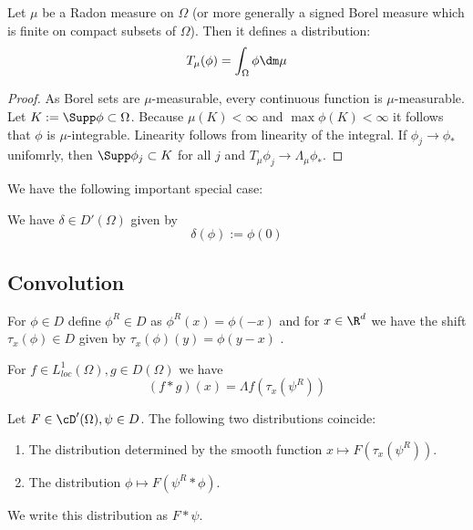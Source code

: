 	\begin{example}
		Let $\mu$ be a Radon measure on $\Omega$ (or more generally a signed Borel measure which is finite on compact subsets of $\Omega$). Then it defines a distribution:
		\[
		T_\mu(\phi) = \int_{\Omega} \phi \dm \mu
		\]
	\end{example}
	\begin{proof}
		As Borel sets are $\mu$-measurable, every continuous function is $\mu$-measurable. Let $K := \Supp \phi \subset \Omega $. Because $\mu(K) < \infty$ and $\max \phi(K) < \infty$ it follows that $\phi$ is $\mu$-integrable. Linearity follows from linearity of the integral. If $\phi_j \to \phi_*$ unifomrly, then $\Supp \phi_j  \subset K$ for all $j$ and $T_\mu \phi_j \to \Lambda_\mu \phi_*$.
	\end{proof}
	We have the following important special case:
	\begin{example}
		We have $\delta \in D'(\Omega)$ given by
		\[
		\delta(\phi) := \phi(0)
		\]
	\end{example}

	\subsection{Convolution}
	\begin{notation}
		For $\phi \in D$ define $\phi^R \in D$ as $\phi^R(x) = \phi(-x)$ and for $x \in \R^d$ we have the shift $\tau_x(\phi) \in D$ given by $\tau_x(\phi)(y) = \phi(y - x)$ .
	\end{notation}
	\begin{example}{\label{ex:conv}}
		For $f \in L^1_{loc}(\Omega), g \in D(\Omega)$ we have
		\[
		(f * g)(x) = \Lambda f (\tau_x (\psi^R))
		\]
	\end{example}
	\begin{proposition}

		Let $F \in \cD'(\Omega) , \psi \in D$. The following two distributions coincide:
		\begin{enumerate}
			\item The distribution determined by the smooth function $x \mapsto F(\tau_x (\psi^R))$.
			\item The distribution $\phi \mapsto F(\psi^R * \phi)$.
		\end{enumerate}
		We write this distribution as $F * \psi$.
	\end{proposition}

